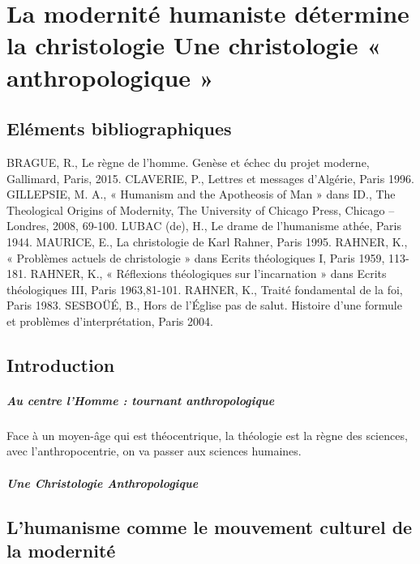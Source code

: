 \chapter{La modernité humaniste détermine la christologie  Une christologie « anthropologique »}

\section{Eléments bibliographiques} BRAGUE, R., Le règne de l’homme. Genèse et échec du projet moderne, Gallimard, Paris, 2015. CLAVERIE, P.,  Lettres et messages d’Algérie, Paris 1996. GILLEPSIE, M. A., « Humanism and the Apotheosis of Man » dans ID., The Theological Origins of Modernity, The University of Chicago Press, Chicago – Londres, 2008, 69-100. LUBAC (de), H., Le drame de l’humanisme athée, Paris 1944. MAURICE, E., La christologie de Karl Rahner, Paris 1995. RAHNER, K., « Problèmes actuels de christologie » dans Ecrits théologiques I, Paris 1959, 113-181. RAHNER, K., « Réflexions théologiques sur l’incarnation » dans Ecrits théologiques III, Paris 1963,81-101. RAHNER, K., Traité fondamental de la foi, Paris 1983. SESBOÜÉ, B., Hors de l’Église pas de salut. Histoire d’une formule et problèmes d’interprétation, Paris 2004. 




\section{Introduction }





\paragraph{Au centre l'Homme : tournant anthropologique} Face à un moyen-âge qui est théocentrique, la théologie est la règne des sciences, avec l'anthropocentrie, on va passer aux sciences humaines. 

\paragraph{Une Christologie Anthropologique}

\section{L’humanisme comme le mouvement culturel de la modernité } 


